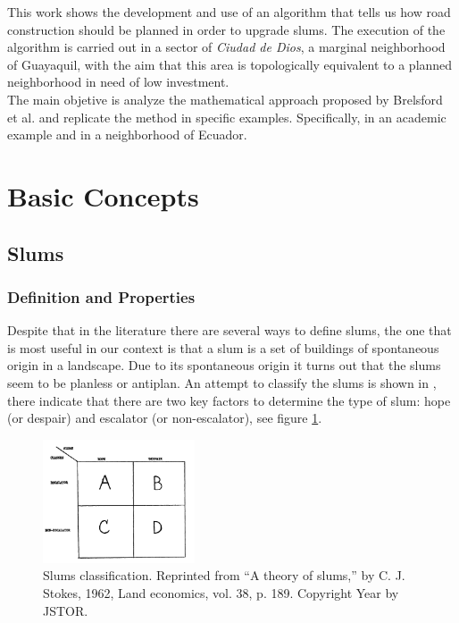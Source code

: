 \documentclass[10pt]{article}
\begin{document}
This work shows the development and use of an algorithm that tells us how road construction should be planned in order to upgrade slums. The execution of the algorithm is carried out in a sector of \emph{Ciudad de Dios}, a marginal neighborhood of Guayaquil, with the aim that this area is topologically equivalent to a planned neighborhood in need of low investment.\\

The main objetive is analyze the mathematical approach proposed by Brelsford et al. \cite{bre} and replicate the method in specific examples. Specifically, in an academic example and in a neighborhood of Ecuador.
\section{Basic Concepts}

\subsection{Slums}
\subsubsection{Definition and Properties}
Despite that in the literature there are several ways to define slums, the one that is most useful in our context is that a slum is a set of buildings of spontaneous origin in a landscape. Due to its spontaneous origin it turns out that the slums seem to be planless or antiplan\cite{stokes1962theory}. An attempt to classify the slums is shown in \cite{stokes1962theory}, there indicate that there are two key factors to determine the type of slum: hope (or despair) and escalator (or non-escalator), see figure \ref{fig:slums_classification}.\\

\begin{figure}[h]
    \centering
    \includegraphics[width=0.4\textwidth]{images/img}
    \caption{Slums classification. Reprinted from “A theory of slums,” by  C. J. Stokes, 1962, Land economics, vol. 38, p. 189. Copyright Year by JSTOR.}
    \label{fig:slums_classification}
\end{figure}
\end{document}
